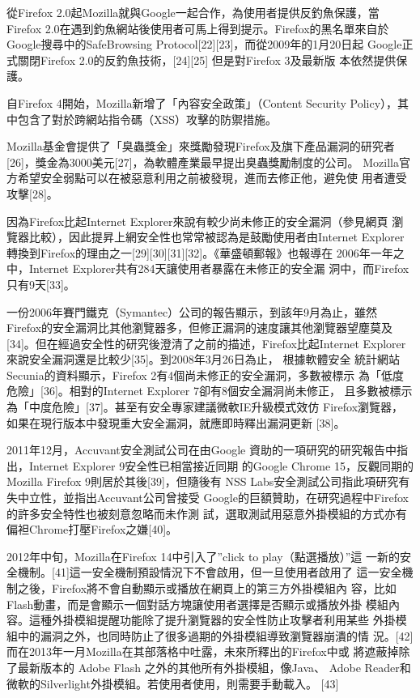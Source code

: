 \documentclass[12pt, a4paper, twoside]{article}
\begin{document}
從Firefox 2.0起Mozilla就與Google一起合作，為使用者提供反釣魚保護，當
Firefox 2.0在遇到釣魚網站後使用者可馬上得到提示。Firefox的黑名單來自於
Google搜尋中的SafeBrowsing Protocol[22][23]，而從2009年的1月20日起
Google正式關閉Firefox 2.0的反釣魚技術，[24][25] 但是對Firefox 3及最新版
本依然提供保護。

自Firefox 4開始，Mozilla新增了「內容安全政策」（Content Security
  Policy），其中包含了對於跨網站指令碼（XSS）攻擊的防禦措施。

Mozilla基金會提供了「臭蟲獎金」來獎勵發現Firefox及旗下產品漏洞的研究者
[26]，獎金為3000美元[27]，為軟體產業最早提出臭蟲獎勵制度的公司。
Mozilla官方希望安全弱點可以在被惡意利用之前被發現，進而去修正他，避免使
用者遭受攻擊[28]。

因為Firefox比起Internet Explorer來說有較少尚未修正的安全漏洞（參見網頁
  瀏覽器比較），因此提昇上網安全性也常常被認為是鼓勵使用者由Internet
Explorer轉換到Firefox的理由之一[29][30][31][32]。《華盛頓郵報》也報導在
2006年一年之中，Internet Explorer共有284天讓使用者暴露在未修正的安全漏
洞中，而Firefox只有9天[33]。

一份2006年賽門鐵克（Symantec）公司的報告顯示，到該年9月為止，雖然
Firefox的安全漏洞比其他瀏覽器多，但修正漏洞的速度讓其他瀏覽器望塵莫及
[34]。但在經過安全性的研究後澄清了之前的描述，Firefox比起Internet
Explorer來說安全漏洞還是比較少[35]。到2008年3月26日為止， 根據軟體安全
統計網站Secunia的資料顯示，Firefox 2有4個尚未修正的安全漏洞，多數被標示
為「低度危險」[36]。相對的Internet Explorer 7卻有8個安全漏洞尚未修正，
且多數被標示為「中度危險」[37]。甚至有安全專家建議微軟IE升級模式效仿
Firefox瀏覽器，如果在現行版本中發現重大安全漏洞，就應即時釋出漏洞更新
[38]。

2011年12月，Accuvant安全測試公司在由Google
資助的一項研究的研究報告中指出，Internet Explorer 9安全性已相當接近同期
的Google Chrome 15，反觀同期的Mozilla Firefox 9則居於其後[39]，但隨後有
NSS Labs安全測試公司指此項研究有失中立性，並指出Accuvant公司曾接受
Google的巨額贊助，在研究過程中Firefox的許多安全特性也被刻意忽略而未作測
試，選取測試用惡意外掛模組的方式亦有偏袒Chrome打壓Firefox之嫌[40]。

2012年中旬，Mozilla在Firefox 14中引入了''click to play（點選播放）''這
一新的安全機制。[41]這一安全機制預設情況下不會啟用，但一旦使用者啟用了
這一安全機制之後，Firefox將不會自動顯示或播放在網頁上的第三方外掛模組內
容，比如Flash動畫，而是會顯示一個對話方塊讓使用者選擇是否顯示或播放外掛
模組內容。這種外掛模組提醒功能除了提升瀏覽器的安全性防止攻擊者利用某些
外掛模組中的漏洞之外，也同時防止了很多過期的外掛模組導致瀏覽器崩潰的情
況。[42]而在2013年一月Mozilla在其部落格中吐露，未來所釋出的Firefox中或
將遮蔽掉除了最新版本的 Adobe Flash 之外的其他所有外掛模組，像Java、
Adobe Reader和微軟的Silverlight外掛模組。若使用者使用，則需要手動載入。
[43]
\end{document}
